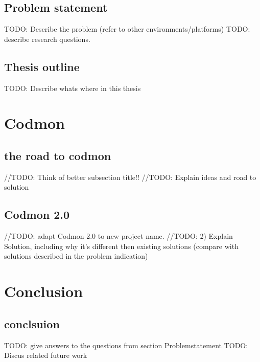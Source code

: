 \documentclass[a4paper,10pt]{scrartcl}
\begin{document}
\subsection{Problem statement}
\label{subsec:Problemstatement}
TODO: Describe the problem (refer to other environments/platforms)
TODO: describe research questions.

\subsection{Thesis outline}
\label{subsec:Thesisoutline}
TODO: Describe whats where in this thesis

\newpage

\section{Codmon}
\label{sec:codmon}

\subsection{the road to codmon}
//TODO: Think of better subsection title!!
//TODO: Explain ideas and road to solution

\subsection{Codmon 2.0}
//TODO: adapt Codmon 2.0 to new project name.
//TODO: 2) Explain Solution, including why it's different then existing solutions (compare with solutions described in the problem indication)

\newpage
\section{Conclusion}
\subsection{conclsuion}
TODO: give answers to the questions from section Problemstatement
TODO: Discus related future work
\newpage


\end{document}
